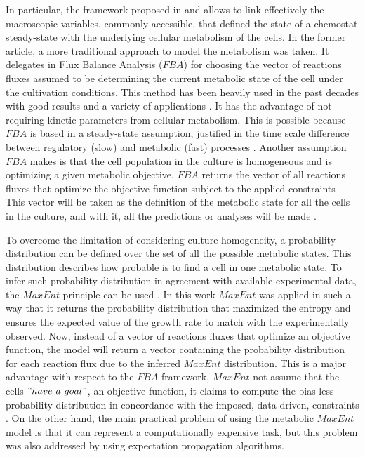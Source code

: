 \documentclass[]{article}
\begin{document}
	In particular, the framework proposed in  and  allows to link effectively the macroscopic variables, commonly accessible, that defined the state of a chemostat steady-state with the underlying cellular metabolism of the cells. 
	In the former article, a more traditional approach to model the metabolism was taken. It delegates in Flux Balance Analysis ($FBA$)  for choosing the vector of reactions fluxes assumed to be determining the current metabolic state of the cell under the cultivation conditions. This method has been heavily used in the past decades with good results and a variety of applications . 
	It has the advantage of not requiring kinetic parameters from cellular metabolism.
	This is possible because $FBA$ is based in a steady-state assumption, justified in the time scale difference between regulatory (slow) and metabolic (fast) processes . 
	Another assumption $FBA$ makes is that the cell population in the culture is homogeneous and is optimizing a given metabolic objective.
	$FBA$ returns the vector of all reactions fluxes that optimize the objective function subject to the applied constraints . 
	This vector will be taken as the definition of the metabolic state for all the cells in the culture, and with it, all the predictions or analyses will be made . 
	
	To overcome the limitation of considering culture homogeneity, a probability distribution can be defined over the set of all the possible metabolic states.
	This distribution describes how probable is to find a cell in one metabolic state.
	To infer such probability distribution in agreement with available experimental data, the $MaxEnt$ principle can be used  . 
	In this work $MaxEnt$ was applied in such a way that it returns the probability distribution that maximized the entropy and ensures the expected value of the growth rate to match with the experimentally observed.
	Now, instead of a vector of reactions fluxes that optimize an objective function, the model will return a vector containing the probability distribution for each reaction flux due to the inferred $MaxEnt$ distribution. 
	This is a major advantage with respect to the $FBA$ framework, $MaxEnt$ not assume that the cells $"have\ a\ goal"$, an objective function, it claims to compute the bias-less probability distribution in concordance with the imposed, data-driven, constraints . On the other hand, the main practical problem of using the metabolic $MaxEnt$ model is that it can represent a computationally expensive task, but this problem was also addressed by  using expectation propagation algorithms.
	
\end{document}
